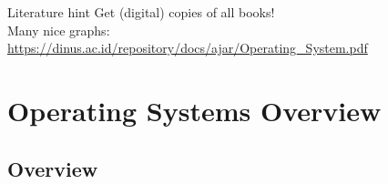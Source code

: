 \documentclass[10pt]{beamer}
\begin{document}
    \begin{frame}{Literature hint}
    \alert{Get (digital) copies of all books!} \vspace{2cm} \\ 
    Many nice graphs: \\ 
    \href{Operating Systems: Internals and Design, William Stallings}{https://dinus.ac.id/repository/docs/ajar/Operating\_System.pdf}
    \end{frame}

\section{Operating Systems Overview}
\subsection{Overview}
\end{document}
